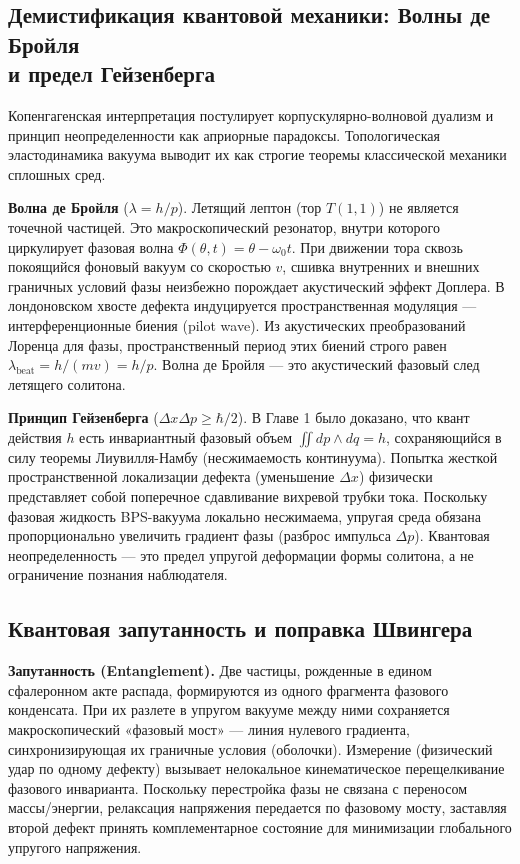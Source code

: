 \documentclass[11pt,a4paper]{article}
\begin{document}
	\subsection{Демистификация квантовой механики: Волны де Бройля\\ и предел Гейзенберга}
	Копенгагенская интерпретация постулирует корпускулярно-волновой дуализм и принцип неопределенности как априорные парадоксы. Топологическая эластодинамика вакуума выводит их как строгие теоремы классической механики сплошных сред.
	
	\textbf{Волна де Бройля} ($\lambda = h/p$). Летящий лептон (тор $T(1,1)$) не является точечной частицей. Это макроскопический резонатор, внутри которого циркулирует фазовая волна $\Phi(\theta, t) = \theta - \omega_0 t$. При движении тора сквозь покоящийся фоновый вакуум со скоростью $v$, сшивка внутренних и внешних граничных условий фазы неизбежно порождает акустический эффект Доплера. В лондоновском хвосте дефекта индуцируется пространственная модуляция — интерференционные биения (pilot wave). Из акустических преобразований Лоренца для фазы, пространственный период этих биений строго равен $\lambda_{\text{beat}} = h / (mv) = h/p$. Волна де Бройля — это акустический фазовый след летящего солитона.
	
	\textbf{Принцип Гейзенберга} ($\Delta x \Delta p \ge \hbar/2$). В Главе 1 было доказано, что квант действия $h$ есть инвариантный фазовый объем $\iint dp \wedge dq = h$, сохраняющийся в силу теоремы Лиувилля-Намбу (несжимаемость континуума). Попытка жесткой пространственной локализации дефекта (уменьшение $\Delta x$) физически представляет собой поперечное сдавливание вихревой трубки тока. Поскольку фазовая жидкость BPS-вакуума локально несжимаема, упругая среда обязана пропорционально увеличить градиент фазы (разброс импульса $\Delta p$). Квантовая неопределенность — это предел упругой деформации формы солитона, а не ограничение познания наблюдателя.
	
	\subsection{Квантовая запутанность и поправка Швингера}
	\textbf{Запутанность (Entanglement).} Две частицы, рожденные в едином сфалеронном акте распада, формируются из одного фрагмента фазового конденсата. При их разлете в упругом вакууме между ними сохраняется макроскопический «фазовый мост» — линия нулевого градиента, синхронизирующая их граничные условия (оболочки). Измерение (физический удар по одному дефекту) вызывает нелокальное кинематическое перещелкивание фазового инварианта. Поскольку перестройка фазы не связана с переносом массы/энергии, релаксация напряжения передается по фазовому мосту, заставляя второй дефект принять комплементарное состояние для минимизации глобального упругого напряжения.
	
\end{document}
